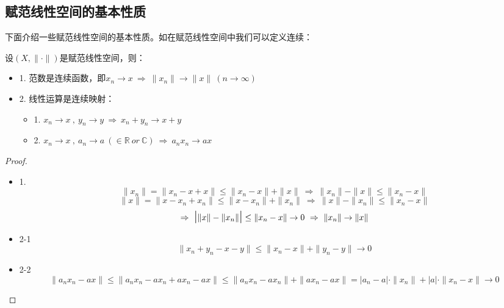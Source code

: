 \subsection*{赋范线性空间的基本性质}
下面介绍一些赋范线性空间的基本性质。如在赋范线性空间中我们可以定义连续：
\begin{theorem}[赋范线性空间的连续性]
    设$(X,\|\cdot\|)$是赋范线性空间，则：
    \begin{itemize}
        \item 1. 范数是连续函数，即$x_n \to x \ \Rightarrow \ \|x_n\| \to \|x\| \ (n \to \infty)$
        \item 2. 线性运算是连续映射：
        \begin{itemize}
            \item 1. $x_n \to x \ , \ y_n \to y \ \Rightarrow \ x_n+y_n \to x+y$
            \item 2. $x_n \to x \ , \ a_n \to a \ (\in \mathbb{R} \ or \ \mathbb{C}) \ \Rightarrow \ a_nx_n \to ax$
        \end{itemize}
    \end{itemize}
\end{theorem}
\begin{proof}
\begin{itemize}
\item 1. 
\[\|x_n\|=\|x_n-x+x\| \leq \|x_n-x\|+\|x\| \ \Rightarrow \ \|x_n\|-\|x\| \leq \|x_n-x\|\]
\[\|x\|=\|x-x_n+x_n\| \leq \|x-x_n\|+\|x_n\| \ \Rightarrow \ \|x\|-\|x_n\| \leq \|x_n-x\|\]
\[\Rightarrow \ \text{\Large|} \|x\|-\|x_n\| \text{\Large|} \leq \|x_n-x\| \to 0 \ \Rightarrow \ \|x_n\| \to \|x\|\]
\item 2-1
\[\|x_n+y_n-x-y\| \leq \|x_n-x\|+\|y_n-y\| \to 0\]
\item 2-2
\[\|a_nx_n-ax\| \leq \|a_nx_n-ax_n+ax_n-ax\| \leq \|a_nx_n-ax_n\|+\|ax_n-ax\|=|a_n-a|\cdot\|x_n\|+|a|\cdot\|x_n-x\| \to 0\]
\end{itemize}
\end{proof}

